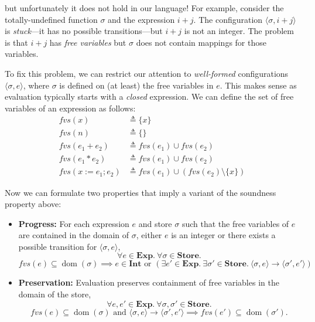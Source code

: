 \documentclass[11pt]{article}
\begin{document}
\noindent but unfortunately it does not hold in our language! For example, consider the
totally-undefined function $\sigma$ and the expression $i + j$. The configuration $\langle
\sigma, i + j \rangle$ is \emph{stuck}---it has no possible transitions---but $i + j$ is not an
integer. The problem is that $i + j$ has \emph{free variables} but $\sigma$ does not contain
mappings for those variables.

To fix this problem, we can restrict our attention to \emph{well-formed} configurations
$\langle \sigma, e \rangle$, where $\sigma$ is defined on (at least) the free variables in $e$.
This makes sense as evaluation typically starts with a \emph{closed} expression. We can define
the set of free variables of an expression as follows:
\begin{align*}
fvs(x) &\triangleq \{x\} \\
fvs(n) &\triangleq \{\} \\
fvs(e_1 + e_2) &\triangleq fvs(e_1) \cup fvs(e_2) \\
fvs(e_1 * e_2) &\triangleq fvs(e_1) \cup fvs(e_2) \\
fvs(x := e_1 ; e_2) &\triangleq fvs(e_1) \cup (fvs(e_2) \setminus \{x\})
\end{align*}

Now we can formulate two properties that imply a variant of the soundness property above:

\begin{itemize}
    \item \textbf{Progress:} For each expression $e$ and store $\sigma$ such that the free
    variables of $e$ are contained in the domain of $\sigma$, either $e$ is an integer or there
    exists a possible transition for $\langle \sigma, e \rangle$,
    \[
    \forall e \in \mathbf{Exp}.\ \forall \sigma \in \mathbf{Store}.
    \]
    \[
    fvs(e) \subseteq \operatorname{dom}(\sigma) \implies e \in \mathbf{Int} \text{ or } (\exists
    e' \in \mathbf{Exp}.\ \exists \sigma' \in \mathbf{Store}.\ \langle \sigma, e \rangle \to
    \langle \sigma', e' \rangle)
    \]

    \item \textbf{Preservation:} Evaluation preserves containment of free variables in the
    domain of the store,
    \[
    \forall e, e' \in \mathbf{Exp}.\ \forall \sigma, \sigma' \in \mathbf{Store}.
    \]
    \[
    fvs(e) \subseteq \operatorname{dom}(\sigma) \text{ and } \langle \sigma, e \rangle \to
    \langle \sigma', e' \rangle \implies fvs(e') \subseteq \operatorname{dom}(\sigma').
    \]
\end{itemize}
\end{document}
